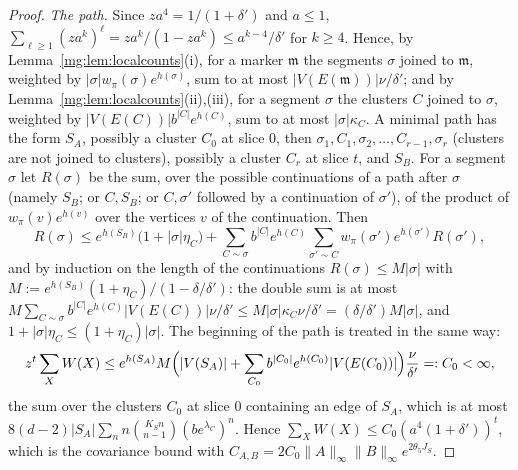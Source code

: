 \documentclass[11pt,a4paper]{article}
\theoremstyle{definition}
\theoremstyle{remark}
\newcommand{\norm}[1]{\lVert #1\rVert}
\begin{document}
\begin{proof}
\emph{The path.} Since $za^4=1/(1+\delta')$ and $a\le1$, $\sum_{\ell\ge1}(za^k)^\ell=za^k/(1-za^k)\le a^{k-4}/\delta'$ for $k\ge4$. Hence, by
Lemma~\ref{mg:lem:localcounts}(i), for a marker $\mathfrak m$ the segments $\sigma$ joined to $\mathfrak m$, weighted by $|\sigma|w_\pi(\sigma)e^{h(\sigma)}$, sum
to at most $|V(E(\mathfrak m))|\nu/\delta'$; and by Lemma~\ref{mg:lem:localcounts}(ii),(iii), for a segment $\sigma$ the clusters $C$ joined to $\sigma$,
weighted by $|V(E(C))|b^{|C|}e^{h(C)}$, sum to at most $|\sigma|\kappa_C$. A minimal path has the form $S_A$, possibly a cluster $C_0$ at slice $0$, then
$\sigma_1,C_1,\sigma_2,\dots,C_{r-1},\sigma_r$ (clusters are not joined to clusters), possibly a cluster $C_r$ at slice $t$, and $S_B$. For a segment $\sigma$ let
$R(\sigma)$ be the sum, over the possible continuations of a path after $\sigma$ (namely $S_B$; or $C,S_B$; or $C,\sigma'$ followed by a continuation of
$\sigma'$), of the product of $w_\pi(v)e^{h(v)}$ over the vertices $v$ of the continuation. Then
\[
R(\sigma)\le e^{h(S_B)}\bigl(1+|\sigma|\eta_C\bigr)+\sum_{C\sim\sigma}b^{|C|}e^{h(C)}\sum_{\sigma'\sim C}w_\pi(\sigma')e^{h(\sigma')}R(\sigma'),
\]
and by induction on the length of the continuations $R(\sigma)\le M|\sigma|$ with $M:=e^{h(S_B)}(1+\eta_C)/(1-\delta/\delta')$: the double sum is at most
$M\sum_{C\sim\sigma}b^{|C|}e^{h(C)}|V(E(C))|\nu/\delta'\le M|\sigma|\kappa_C\nu/\delta'=(\delta/\delta')M|\sigma|$, and $1+|\sigma|\eta_C\le(1+\eta_C)|\sigma|$. The beginning of the
path is treated in the same way:
\[
z^t\sum_XW(X)\le e^{h(S_A)}M\Bigl(|V(S_A)|+\sum_{C_0}b^{|C_0|}e^{h(C_0)}|V(E(C_0))|\Bigr)\frac\nu{\delta'}=:C_0<\infty,
\]
the sum over the clusters $C_0$ at slice $0$ containing an edge of $S_A$, which is at most $8(d-2)|S_A|\sum_nn\binom{K_Sn}{n-1}(be^{\lambda_C})^n$. Hence
$\sum_XW(X)\le C_0(a^4(1+\delta'))^t$, which is the covariance bound with $C_{A,B}=2C_0\norm A_\infty\norm B_\infty e^{2\theta_5J_S}$.


\end{proof}
\end{document}
